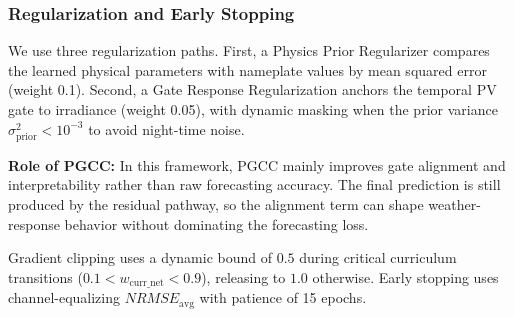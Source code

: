 \subsubsection{Regularization and Early Stopping}
We use three regularization paths. First, a Physics Prior Regularizer compares the learned physical parameters with nameplate values by mean squared error (weight 0.1). Second, a Gate Response Regularization anchors the temporal PV gate to irradiance (weight 0.05), with dynamic masking when the prior variance $\sigma^2_{\text{prior}} < 10^{-3}$ to avoid night-time noise.

\textbf{Role of PGCC:} In this framework, PGCC mainly improves gate alignment and interpretability rather than raw forecasting accuracy. The final prediction is still produced by the residual pathway, so the alignment term can shape weather-response behavior without dominating the forecasting loss.

Gradient clipping uses a dynamic bound of $0.5$ during critical curriculum transitions ($0.1 < w_{\text{curr\_net}} < 0.9$), releasing to $1.0$ otherwise. Early stopping uses channel-equalizing $NRMSE_{\text{avg}}$ with patience of 15 epochs.
